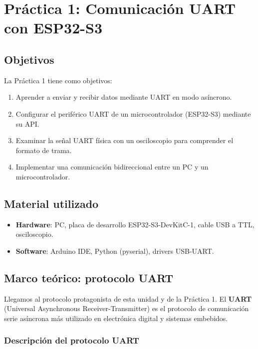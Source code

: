 \section{Práctica 1: Comunicación UART con ESP32-S3}
\label{sec:practica1}

\subsection{Objetivos}

La Práctica 1 tiene como objetivos:
\begin{enumerate}
    \item Aprender a enviar y recibir datos mediante UART en modo asíncrono.
    \item Configurar el periférico UART de un microcontrolador (ESP32-S3) mediante su API.
    \item Examinar la señal UART física con un osciloscopio para comprender el formato de trama.
    \item Implementar una comunicación bidireccional entre un PC y un microcontrolador.
\end{enumerate}

\subsection{Material utilizado}

\begin{itemize}
    \item \textbf{Hardware}: PC, placa de desarrollo ESP32-S3-DevKitC-1, cable USB a TTL, osciloscopio.
    \item \textbf{Software}: Arduino IDE, Python (pyserial), drivers USB-UART.
\end{itemize}


\subsection{Marco teórico: protocolo UART}

\label{sec:uart}

Llegamos al protocolo protagonista de esta unidad y de la Práctica 1. El \textbf{UART} (Universal Asynchronous Receiver-Transmitter) es el protocolo de comunicación serie asíncrona más utilizado en electrónica digital y sistemas embebidos.

\subsubsection{Descripción del protocolo UART}

